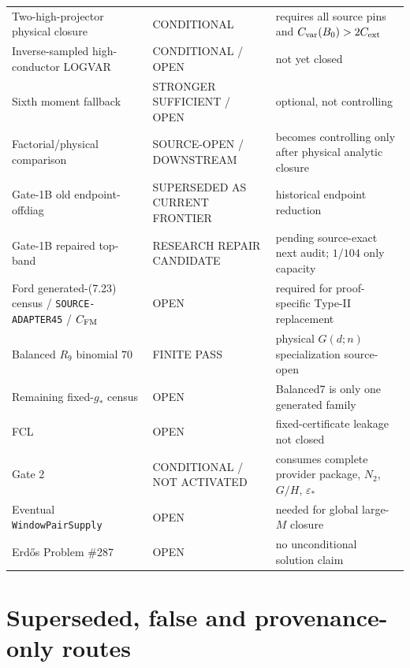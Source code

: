 \documentclass[11pt]{article}
\theoremstyle{definition}
\newcommand{\1}{\mathbf 1}
\newcommand{\status}[1]{\textsf{#1}}
\begin{document}
{\begin{longtable}{>{\raggedright\arraybackslash}p{}
>{\raggedright\arraybackslash}p{}
>{\raggedright\arraybackslash}p{}}
Two-high-projector physical closure & \status{CONDITIONAL} & requires all source pins and $C_{\rm var}(B_0)>2C_{\rm ext}$\\
Inverse-sampled high-conductor LOGVAR & \status{CONDITIONAL / OPEN} & not yet closed\\
Sixth moment fallback & \status{STRONGER SUFFICIENT / OPEN} & optional, not controlling\\
Factorial/physical comparison & \status{SOURCE-OPEN / DOWNSTREAM} & becomes controlling only after physical analytic closure\\
Gate-1B old endpoint-offdiag & \status{SUPERSEDED AS CURRENT FRONTIER} & historical endpoint reduction\\
Gate-1B repaired top-band & \status{RESEARCH REPAIR CANDIDATE} & pending source-exact next audit; $1/104$ only capacity\\
Ford generated-(7.23) census / \texttt{SOURCE-ADAPTER45} / $C_{\rm FM}$ & \status{OPEN} & required for proof-specific Type-II replacement\\
Balanced $R_9$ binomial $70$ & \status{FINITE PASS} & physical $G(d;n)$ specialization source-open\\
Remaining fixed-$g_\ast$ census & \status{OPEN} & Balanced7 is only one generated family\\
FCL & \status{OPEN} & fixed-certificate leakage not closed\\
Gate 2 & \status{CONDITIONAL / NOT ACTIVATED} & consumes complete provider package, $N_2$, $G/H$, $\varepsilon_\ast$\\
Eventual \texttt{WindowPairSupply} & \status{OPEN} & needed for global large-$M$ closure\\
Erd\H{o}s Problem \#287 & \status{OPEN} & no unconditional solution claim\\
\bottomrule
\end{longtable}}


\section{Superseded, false and provenance-only routes}
\label{sec:provenance-only}
\end{document}
